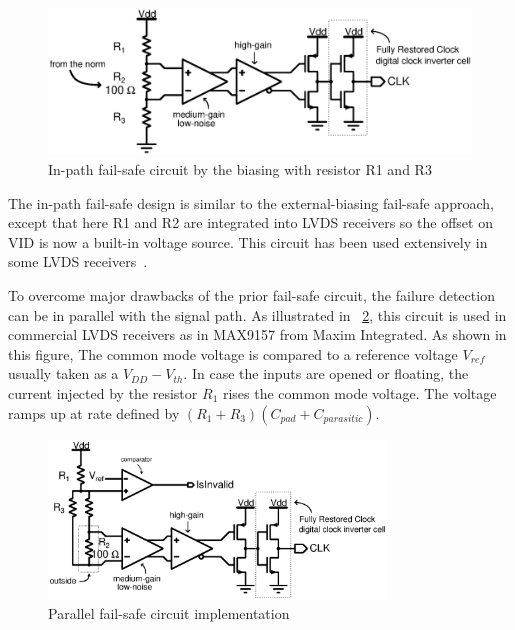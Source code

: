 \begin{figure}[htp]
    \centering
    \includegraphics[width=\textwidth]{Chapter5/Figs/adc_chip/lvds-external-failsafe.ps}
    \caption{In-path fail-safe circuit by the biasing with resistor R1 and R3}
    \label{fig:in-path-fail-safe}
\end{figure}


The in-path fail-safe design is similar to the external-biasing fail-safe approach, except that here R1 and R2 are integrated into LVDS receivers so the offset on VID is now a built-in voltage source. This circuit has been used extensively in some LVDS receivers~\cite{TI-SLLA082B}. 

To overcome major drawbacks of the prior fail-safe circuit, the failure detection can be in parallel with the signal path. As illustrated in \figurename~\ref{fig:parallel-fail-safe}, this circuit is used in commercial LVDS receivers as in MAX9157 from Maxim Integrated. As shown in this figure, The common mode voltage is compared to a reference voltage $V_{ref}$ usually taken as a $V_{DD}-V_{th}$. In case the inputs are opened or floating, the current injected by the resistor $R_1$ rises the common mode voltage. The voltage ramps up at rate defined by $(R_1+R_3)(C_{pad}+C_{parasitic})$.

\begin{figure}[htp]
    \centering
    \includegraphics[width=0.8\textwidth]{Chapter5/Figs/adc_chip/lvds-parallel-failsafe.ps}
    \caption{Parallel fail-safe circuit implementation}
    \label{fig:parallel-fail-safe}
\end{figure}

